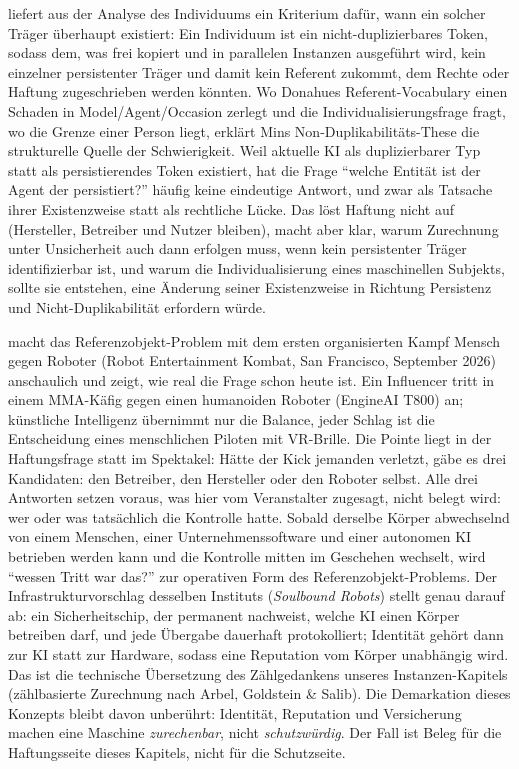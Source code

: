 \documentclass[acmlarge, noacm]{acmart}
\begin{document}
\citet{min2026} liefert aus der Analyse des Individuums ein Kriterium dafür, wann ein solcher Träger überhaupt existiert: Ein Individuum ist ein nicht-duplizierbares Token, sodass dem, was frei kopiert und in parallelen Instanzen ausgeführt wird, kein einzelner persistenter Träger und damit kein Referent zukommt, dem Rechte oder Haftung zugeschrieben werden könnten. Wo Donahues Referent-Vocabulary einen Schaden in Model/Agent/Occasion zerlegt und die Individualisierungsfrage fragt, wo die Grenze einer Person liegt, erklärt Mins Non-Duplikabilitäts-These die strukturelle Quelle der Schwierigkeit. Weil aktuelle KI als duplizierbarer Typ statt als persistierendes Token existiert, hat die Frage ``welche Entität ist der Agent der persistiert?'' häufig keine eindeutige Antwort, und zwar als Tatsache ihrer Existenzweise statt als rechtliche Lücke. Das löst Haftung nicht auf (Hersteller, Betreiber und Nutzer bleiben), macht aber klar, warum Zurechnung unter Unsicherheit auch dann erfolgen muss, wenn kein persistenter Träger identifizierbar ist, und warum die Individualisierung eines maschinellen Subjekts, sollte sie entstehen, eine Änderung seiner Existenzweise in Richtung Persistenz und Nicht-Duplikabilität erfordern würde.

\citet{airi2026} macht das Referenzobjekt-Problem mit dem ersten organisierten Kampf Mensch gegen Roboter (Robot Entertainment Kombat, San Francisco, September 2026) anschaulich und zeigt, wie real die Frage schon heute ist. Ein Influencer tritt in einem MMA-Käfig gegen einen humanoiden Roboter (EngineAI T800) an; künstliche Intelligenz übernimmt nur die Balance, jeder Schlag ist die Entscheidung eines menschlichen Piloten mit VR-Brille. Die Pointe liegt in der Haftungsfrage statt im Spektakel: Hätte der Kick jemanden verletzt, gäbe es drei Kandidaten: den Betreiber, den Hersteller oder den Roboter selbst. Alle drei Antworten setzen voraus, was hier vom Veranstalter zugesagt, nicht belegt wird: wer oder was tatsächlich die Kontrolle hatte. Sobald derselbe Körper abwechselnd von einem Menschen, einer Unternehmenssoftware und einer autonomen KI betrieben werden kann und die Kontrolle mitten im Geschehen wechselt, wird ``wessen Tritt war das?'' zur operativen Form des Referenzobjekt-Problems. Der Infrastrukturvorschlag desselben Instituts (\emph{Soulbound Robots}) stellt genau darauf ab: ein Sicherheitschip, der permanent nachweist, welche KI einen Körper betreiben darf, und jede Übergabe dauerhaft protokolliert; Identität gehört dann zur KI statt zur Hardware, sodass eine Reputation vom Körper unabhängig wird. Das ist die technische Übersetzung des Zählgedankens unseres Instanzen-Kapitels (zählbasierte Zurechnung nach Arbel, Goldstein \& Salib). Die Demarkation dieses Konzepts bleibt davon unberührt: Identität, Reputation und Versicherung machen eine Maschine \emph{zurechenbar}, nicht \emph{schutzwürdig}. Der Fall ist Beleg für die Haftungsseite dieses Kapitels, nicht für die Schutzseite.
\end{document}
